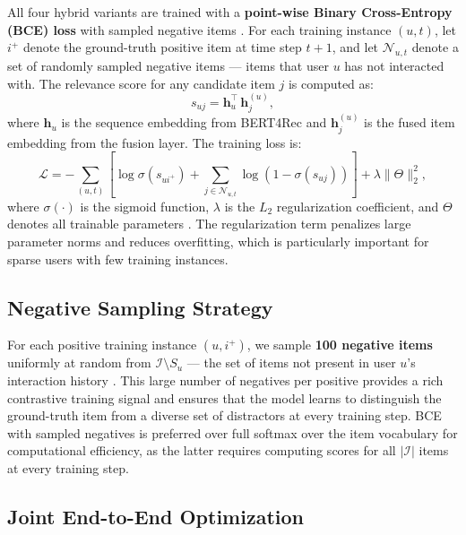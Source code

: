 \documentclass[12pt,a4paper]{report}
\newcommand{\parencite}[1]{\citep{#1}}
\begin{document}
All four hybrid variants are trained with a
\textbf{point-wise Binary Cross-Entropy (BCE) loss} with sampled
negative items \parencite{ouledmeriem2025hybrid}. For each
training instance $(u, t)$, let $i^+$ denote the ground-truth
positive item at time step $t+1$, and let $\mathcal{N}_{u,t}$
denote a set of randomly sampled negative items --- items that
user $u$ has not interacted with. The relevance score for any
candidate item $j$ is computed as:
\begin{equation}
  s_{uj} = \mathbf{h}_u^\top\, \mathbf{h}_j^{(u)},
\end{equation}
where $\mathbf{h}_u$ is the sequence embedding from BERT4Rec
and $\mathbf{h}_j^{(u)}$ is the fused item embedding from the
fusion layer. The training loss is:
\begin{equation}
  \mathcal{L} = -\sum_{(u,t)}
    \left[
      \log \sigma\!\left(s_{u i^+}\right)
      + \sum_{j \in \mathcal{N}_{u,t}}
        \log\!\left(1 - \sigma\!\left(s_{uj}\right)\right)
    \right]
    + \lambda \|\Theta\|_2^2,
\end{equation}
where $\sigma(\cdot)$ is the sigmoid function, $\lambda$ is the
$L_2$ regularization coefficient, and $\Theta$ denotes all
trainable parameters \parencite{ouledmeriem2025hybrid}. The
regularization term penalizes large parameter norms and reduces
overfitting, which is particularly important for sparse users
with few training instances.

\subsection{Negative Sampling Strategy}

For each positive training instance $(u, i^+)$, we sample
\textbf{100 negative items} uniformly at random from
$\mathcal{I} \setminus S_u$ --- the set of items not present
in user $u$'s interaction history \parencite{ouledmeriem2025hybrid}.
This large number of negatives per positive provides a rich
contrastive training signal and ensures that the model learns
to distinguish the ground-truth item from a diverse set of
distractors at every training step. BCE with sampled negatives
is preferred over full softmax over the item vocabulary for
computational efficiency, as the latter requires computing
scores for all $|\mathcal{I}|$ items at every training step.

\subsection{Joint End-to-End Optimization}
\end{document}

